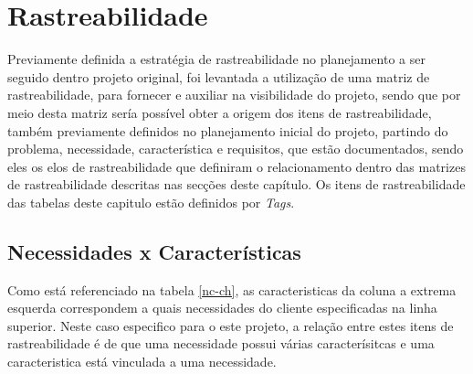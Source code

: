 \chapter{Rastreabilidade}

\label{sec:rastreabilidade}
Previamente definida a estratégia de rastreabilidade no planejamento a ser seguido dentro projeto original, foi levantada a utilização de uma matriz de rastreabilidade, para fornecer e auxiliar na visibilidade do projeto, sendo que por meio desta matriz sería possível obter a origem dos itens de rastreabilidade, também previamente definidos no planejamento inicial do projeto, partindo do problema, necessidade, característica e requisitos, que estão documentados, sendo eles os elos de rastreabilidade que definiram o relacionamento dentro das matrizes de rastreabilidade descritas nas secções deste capítulo. Os itens de rastreabilidade  das tabelas deste capitulo estão definidos por \textit{Tags}.


\section{Necessidades x Características}

Como está referenciado na tabela \ref{nc-ch}, as caracteristicas da coluna a extrema esquerda correspondem a quais necessidades do cliente especificadas na linha superior. Neste caso especifico para o este projeto, a relação entre estes itens de rastreabilidade é de que uma necessidade possui várias caracterísitcas e uma caracteristica está vinculada a uma necessidade.

